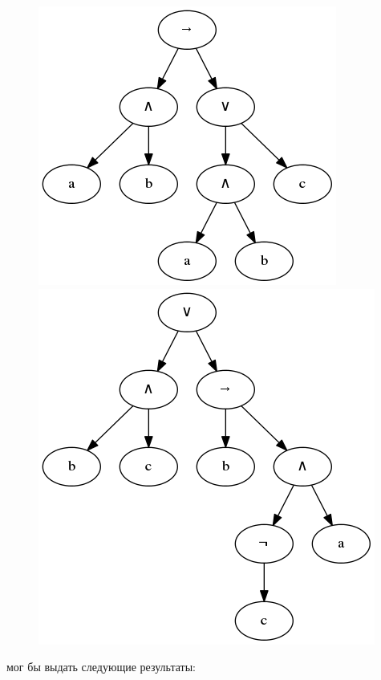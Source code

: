 \documentclass[12pt,fleqn]{article}
\begin{document}
\begin{figure}[!h]%
  \centering
  \begin{minipage}{2in}%
    \centering
    \includegraphics[scale=0.3]{t1.png}
  \end{minipage}%
  \qquad
  \begin{minipage}{2in}%
    \centering
    \includegraphics[scale=0.3]{t2.png}
  \end{minipage}%
\end{figure}

\FloatBarrier

мог бы выдать следующие результаты:
\end{document}
